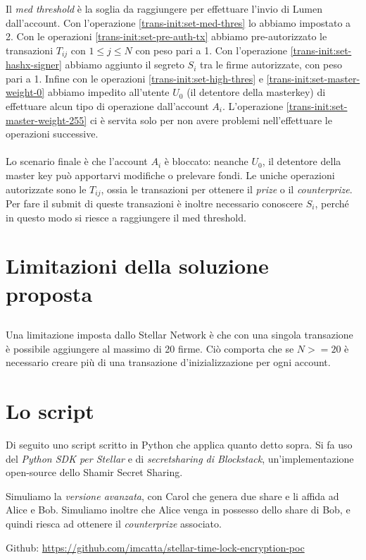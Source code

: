 Il \textit{med threshold} è la soglia da raggiungere per effettuare
l'invio di Lumen dall'account.
Con l'operazione \ref{trans-init:set-med-thres} lo abbiamo impostato a 2.
Con le operazioni \ref{trans-init:set-pre-auth-tx} abbiamo pre-autorizzato
le transazioni
$ T_{ij} $ con $ 1 \leq j \leq N $ con peso pari a 1.
Con l'operazione \ref{trans-init:set-hashx-signer} abbiamo aggiunto il segreto
$ S_i $ tra le firme autorizzate, con peso pari a 1.
Infine con le operazioni \ref{trans-init:set-high-thres} e
\ref{trans-init:set-master-weight-0} abbiamo impedito all'utente $ U_0 $ (il
detentore della masterkey) di effettuare alcun tipo di operazione dall'account $ A_i $.
L'operazione \ref{trans-init:set-master-weight-255} ci è servita solo per
non avere problemi
nell'effettuare le operazioni successive.
\\
\\
Lo scenario finale è che l'account $ A_i $ è bloccato: neanche $ U_0 $, il detentore
della master key può apportarvi modifiche o prelevare fondi. Le uniche operazioni
autorizzate sono le $ T_{ij} $, ossia le transazioni per ottenere il \textit{prize}
o il \textit{counterprize}. Per fare il submit di queste transazioni è inoltre
necessario conoscere $ S_i $, perché in questo modo si riesce a raggiungere
il med threshold.

\section{Limitazioni della soluzione proposta}

\subsection{}
Una limitazione imposta dallo Stellar Network è che con
una singola transazione è possibile aggiungere al massimo di 20 firme.
Ciò comporta che se $ N >= 20 $ è necessario creare più di una transazione
d'inizializzazione per ogni account.




\section{Lo script}
Di seguito uno script scritto in Python che applica quanto detto sopra.
Si fa uso del \textit{Python SDK per Stellar} e di
\textit{secretsharing di Blockstack}, un'implementazione open-source dello
Shamir Secret Sharing.

Simuliamo la \textit{versione avanzata}, con Carol che genera due share e li
affida ad Alice e Bob.
Simuliamo inoltre che Alice venga in possesso dello share di Bob, e quindi riesca ad
ottenere il \textit{counterprize} associato.

Github:
\url{https://github.com/imcatta/stellar-time-lock-encryption-poc}